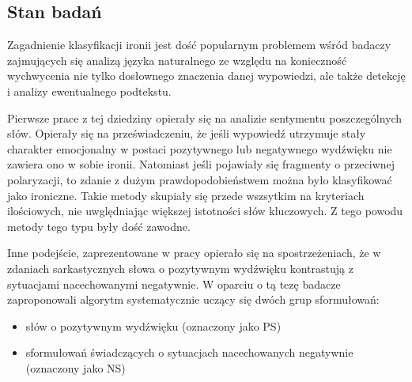 \subsection{Stan badań}

Zagadnienie klasyfikacji ironii jest dość popularnym problemem wśród badaczy zajmujących się analizą języka naturalnego ze względu na konieczność wychwycenia nie tylko dosłownego znaczenia danej wypowiedzi, ale także detekcję i analizy ewentualnego podtekstu.


Pierwsze prace z tej dziedziny opierały się na analizie sentymentu poszczególnych słów. Opierały się na przeświadczeniu, że jeśli wypowiedź utrzymuje stały charakter emocjonalny w postaci pozytywnego lub negatywnego wydźwięku    nie zawiera ono w sobie ironii. Natomiast jeśli pojawiały się fragmenty o przeciwnej polaryzacji, to zdanie z dużym prawdopodobieństwem można było klasyfikować jako ironiczne. Takie metody skupiały się przede wszsytkim na kryteriach ilościowych, nie uwględniając większej istotności słów kluczowych. Z tego powodu metody tego typu były dość zawodne.





Inne podejście, zaprezentowane w pracy \cite{Riloff2013} opierało się na spostrzeżeniach, że w zdaniach sarkastycznych słowa o pozytywnym wydźwięku kontrastują z sytuacjami nacechowanymi negatywnie. W oparciu o tą tezę badacze zaproponowali algorytm systematycznie uczący się dwóch grup sformułowań:

\begin{itemize}
    \item słów o pozytywnym wydźwięku (oznaczony jako PS)
    \item sformułowań świadczących o sytuacjach nacechowanych negatywnie (oznaczony jako NS)
\end{itemize}


